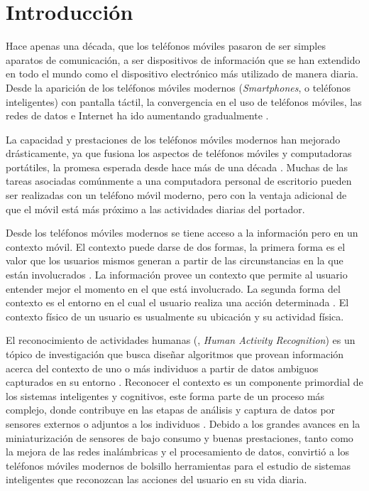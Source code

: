 
\chapter{Introducción}

\label{chap1:introduccion}

Hace apenas una década, que los teléfonos móviles pasaron de ser simples
aparatos de comunicación, a ser dispositivos de información que se
han extendido en todo el mundo como el dispositivo electrónico más
utilizado de manera diaria. Desde la aparición de los teléfonos móviles
modernos (\emph{Smartphones}, o teléfonos inteligentes) con pantalla
táctil, la convergencia en el uso de teléfonos móviles, las redes
de datos e Internet ha ido aumentando gradualmente \cite{Fling2009}.

La capacidad y prestaciones de los teléfonos móviles modernos han
mejorado drásticamente, ya que fusiona los aspectos de teléfonos móviles
y computadoras portátiles, la promesa esperada desde hace más de una
década \cite{Tanenbaum2010}. Muchas de las tareas asociadas comúnmente
a una computadora personal de escritorio pueden ser realizadas con
un teléfono móvil moderno, pero con la ventaja adicional de que el
móvil está más próximo a las actividades diarias del portador.

Desde los teléfonos móviles modernos se tiene acceso a la información
pero en un contexto móvil. El contexto puede darse de dos formas,
la primera forma es el valor que los usuarios mismos generan a partir
de las circunstancias en la que están involucrados \cite{Fling2009}.
La información provee un contexto que permite al usuario entender
mejor el momento en el que está involucrado. La segunda forma del
contexto es el entorno en el cual el usuario realiza una acción determinada
\cite{Fling2009}. El contexto físico de un usuario es usualmente
su ubicación y su actividad física. 

El reconocimiento de actividades humanas (, \emph{Human
Activity Recognition}) es un tópico de investigación que busca diseñar
algoritmos que provean información acerca del contexto de uno o más
individuos a partir de datos ambiguos capturados en su entorno \cite{Bao2004}.
Reconocer el contexto es un componente primordial de los sistemas
inteligentes y cognitivos, este forma parte de un proceso más complejo,
donde contribuye en las etapas de análisis y captura de datos por
sensores externos o adjuntos a los individuos \cite{ReyesOrtiz2015,Chen2012}.
Debido a los grandes avances en la miniaturización de sensores de
bajo consumo y buenas prestaciones, tanto como la mejora de las redes
inalámbricas y el procesamiento de datos, convirtió a los teléfonos
móviles modernos de bolsillo herramientas para el estudio de sistemas
inteligentes que reconozcan las acciones del usuario en su vida diaria. 

